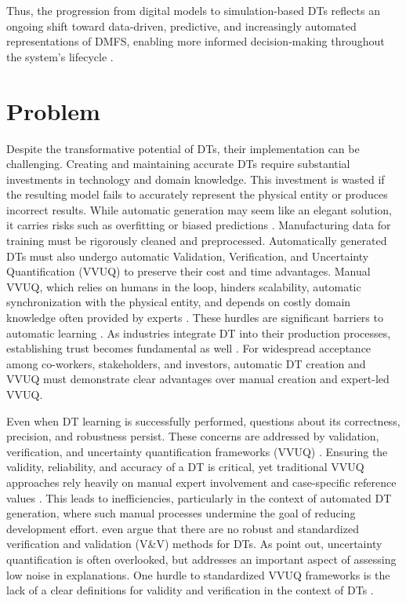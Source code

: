 Thus, the progression from digital models to simulation-based DTs reflects an ongoing shift toward data-driven, predictive, and increasingly automated representations of DMFS, enabling more informed decision-making throughout the system's lifecycle \autocite{boschert2016digital,lim2020state}.

\section{Problem}
\label{sec:problem}
Despite the transformative potential of DTs, their implementation can be challenging. Creating and maintaining accurate DTs require substantial investments in technology and domain knowledge. This investment is wasted if the resulting model fails to accurately represent the physical entity or produces incorrect results. While automatic generation may seem like an elegant solution, it carries risks such as overfitting or biased predictions \autocite{gemanbias}. Manufacturing data for training must be rigorously cleaned and preprocessed. Automatically generated DTs must also undergo automatic Validation, Verification, and Uncertainty Quantification (VVUQ) to preserve their cost and time advantages. Manual VVUQ, which relies on humans in the loop, hinders scalability, automatic synchronization with the physical entity, and depends on costly domain knowledge often provided by experts \autocite{Bitencourt2023}. These hurdles are significant barriers to automatic learning \autocite{ribeiro2016should,zhao2024data}. As industries integrate DT into their production processes, establishing trust becomes fundamental as well \autocite{trauer2022digital,arrieta2020explainable}. For widespread acceptance among co-workers, stakeholders, and investors, automatic DT creation and VVUQ must demonstrate clear advantages over manual creation and expert-led VVUQ.

Even when DT learning is successfully performed, questions about its correctness, precision, and robustness persist. These concerns are addressed by validation, verification, and uncertainty quantification frameworks (VVUQ) \autocite{sel2025survey}. Ensuring the validity, reliability, and accuracy of a DT is critical, yet traditional VVUQ approaches rely heavily on manual expert involvement and case-specific reference values \autocite{Bitencourt2023,hua2022validation}. This leads to inefficiencies, particularly in the context of automated DT generation, where such manual processes undermine the goal of reducing development effort. \citeauthor{hua2022validation} even argue that there are no robust and standardized verification and validation (V&V) methods for DTs. As \autocite{sel2025survey} point out, uncertainty quantification is often overlooked, but addresses an important aspect of assessing low noise in explanations. One hurdle to standardized VVUQ frameworks is the lack of a clear definitions for validity and verification in the context of DTs \autocite{Bitencourt2023}.

